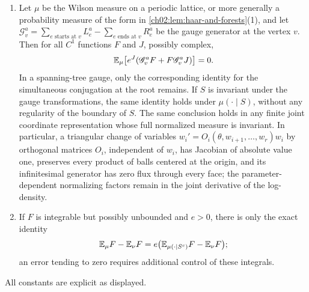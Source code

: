 \begin{lemma}
\begin{enumerate}
\[\]
joint $C^1$ regularity of $V$ and $F$ on a fixed compact domain and a neighborhood of the parameter suffices. Then, with $p_\theta=Z(\theta)^{-1}e^{-V(\theta,\cdot)}$,
\[
 \partial_\theta\log Z=-\E_\theta\partial_\theta V,\qquad
 \partial_\theta\log p_\theta=-\partial_\theta V+\E_\theta\partial_\theta V,
\]
\[
 \partial_\theta\E_\theta F=\E_\theta\partial_\theta F-\Cov_\theta(F,\partial_\theta V).
\]
These are identities for the full normalized density, and the covariance is bilinear for complex $F$.
\item Let $\mu$ be the Wilson measure on a periodic lattice, or more generally a probability measure of the form in \cref{ch02:lem:haar-and-forests}(1), and let $\mathscr G_v^a=\sum_{e\text{ starts at }v}L_e^a-\sum_{e\text{ ends at }v}R_e^a$ be the gauge generator at the vertex $v$. Then for all $C^1$ functions $F$ and $J$, possibly complex,
\[
 \mathbb E_\mu\bigl[e^J(\mathscr G_v^aF+F\mathscr G_v^aJ)\bigr]=0.
\]
In a spanning-tree gauge, only the corresponding identity for the simultaneous conjugation at the root remains. If $S$ is invariant under the gauge transformations, the same identity holds under $\mu(\cdot\mid S)$, without any regularity of the boundary of $S$. The same conclusion holds in any finite joint coordinate representation whose full normalized measure is invariant. In particular, a triangular change of variables $w_i'=O_i(\theta,w_{i+1},\dots,w_r)w_i$ by orthogonal matrices $O_i$, independent of $w_i$, has Jacobian of absolute value one, preserves every product of balls centered at the origin, and its infinitesimal generator has zero flux through every face; the parameter-dependent normalizing factors remain in the joint derivative of the log-density.
\item If $F$ is integrable but possibly unbounded and $e>0$, there is only the exact identity
\[
 \mathbb E_\mu F-\mathbb E_\nu F=e\bigl(\mathbb E_{\mu(\cdot\mid S^c)}F-\mathbb E_\nu F\bigr);
\]
an error tending to zero requires additional control of these integrals.
\end{enumerate}
All constants are explicit as displayed.
\end{lemma}

